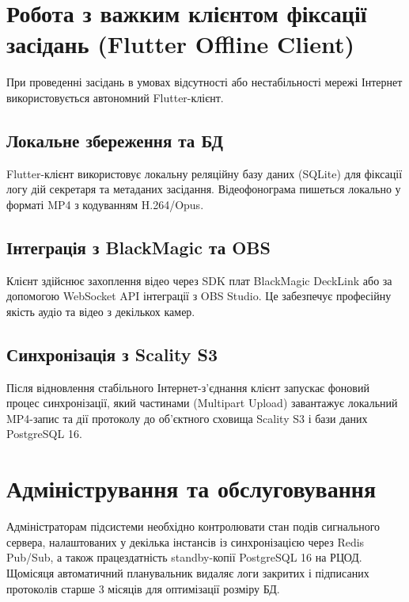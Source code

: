 \documentclass{article}
\begin{document}
\section{Робота з важким клієнтом фіксації засідань (Flutter Offline Client)}
При проведенні засідань в умовах відсутності або нестабільності мережі Інтернет використовується автономний Flutter-клієнт.

\subsection{Локальне збереження та БД}
Flutter-клієнт використовує локальну реляційну базу даних (SQLite) для фіксації логу дій секретаря та метаданих засідання. Відеофонограма пишеться локально у форматі MP4 з кодуванням H.264/Opus.

\subsection{Інтеграція з BlackMagic та OBS}
Клієнт здійснює захоплення відео через SDK плат BlackMagic DeckLink або за допомогою WebSocket API інтеграції з OBS Studio. Це забезпечує професійну якість аудіо та відео з декількох камер.

\subsection{Синхронізація з Scality S3}
Після відновлення стабільного Інтернет-з'єднання клієнт запускає фоновий процес синхронізації, який частинами (Multipart Upload) завантажує локальний MP4-запис та дії протоколу до об'єктного сховища Scality S3 і бази даних PostgreSQL 16.

\section{Адміністрування та обслуговування}
Адміністраторам підсистеми необхідно контролювати стан подів сигнального сервера, налаштованих у декілька інстансів із синхронізацією через Redis Pub/Sub, а також працездатність standby-копії PostgreSQL 16 на РЦОД. Щомісяця автоматичний планувальник видаляє логи закритих і підписаних протоколів старше 3 місяців для оптимізації розміру БД.
\end{document}
